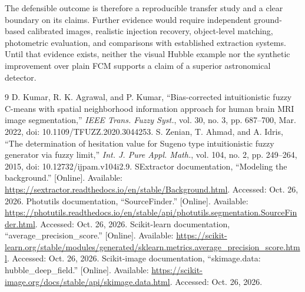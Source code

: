 \documentclass[conference]{IEEEtran}
\begin{document}
The defensible outcome is therefore a reproducible transfer study and a clear boundary on its claims. Further evidence would require independent ground-based calibrated images, realistic injection recovery, object-level matching, photometric evaluation, and comparisons with established extraction systems. Until that evidence exists, neither the visual Hubble example nor the synthetic improvement over plain FCM supports a claim of a superior astronomical detector.

\begin{thebibliography}{9}
 D. Kumar, R. K. Agrawal, and P. Kumar, ``Bias-corrected intuitionistic fuzzy C-means with spatial neighborhood information approach for human brain MRI image segmentation,'' \emph{IEEE Trans. Fuzzy Syst.}, vol. 30, no. 3, pp. 687--700, Mar. 2022, doi: 10.1109/TFUZZ.2020.3044253.
 S. Zenian, T. Ahmad, and A. Idris, ``The determination of hesitation value for Sugeno type intuitionistic fuzzy generator via fuzzy limit,'' \emph{Int. J. Pure Appl. Math.}, vol. 104, no. 2, pp. 249--264, 2015, doi: 10.12732/ijpam.v104i2.9.
 SExtractor documentation, ``Modeling the background.'' [Online]. Available: \url{https://sextractor.readthedocs.io/en/stable/Background.html}. Accessed: Oct. 26, 2026.
 Photutils documentation, ``SourceFinder.'' [Online]. Available: \url{https://photutils.readthedocs.io/en/stable/api/photutils.segmentation.SourceFinder.html}. Accessed: Oct. 26, 2026.
 Scikit-learn documentation, ``average\_precision\_score.'' [Online]. Available: \url{https://scikit-learn.org/stable/modules/generated/sklearn.metrics.average_precision_score.html}. Accessed: Oct. 26, 2026.
 Scikit-image documentation, ``skimage.data: hubble\_deep\_field.'' [Online]. Available: \url{https://scikit-image.org/docs/stable/api/skimage.data.html}. Accessed: Oct. 26, 2026.
\end{thebibliography}
\end{document}
